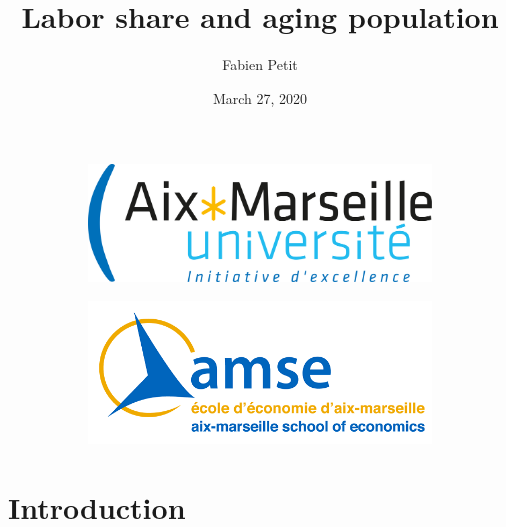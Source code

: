 \documentclass{beamer}
\begin{document}
	\title[Labor share \& aging population]{Labor share and aging population}
	\author{Fabien Petit}
	\date{March 27, 2020}
	
	\begin{frame}
		\titlepage
		\vspace{-0.5cm}
		\begin{figure}
			\begin{subfigure}[h]{0.49\linewidth}
				\centering
				\includegraphics[width=0.7\linewidth]{Pictures/amu} 
			\end{subfigure}
			\begin{subfigure}[h]{0.49\linewidth}
				\centering
				\includegraphics[width=0.7\linewidth]{Pictures/amse.png}
			\end{subfigure}
		\end{figure}
	\end{frame}

	\section{Introduction}
\end{document}
